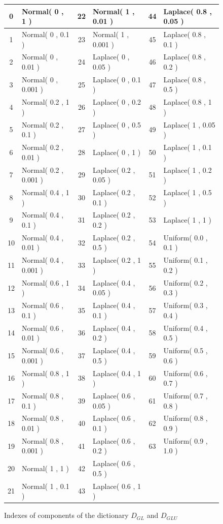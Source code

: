 \begin{figure}
\center
\begin{tabular}{|c|l|c|l|c|l|}
\hline
0 & Normal( 0 , 1 ) &22 & Normal( 1 , 0.01 ) &44 & Laplace( 0.8 , 0.05 ) \\ \hline
1 & Normal( 0 , 0.1 ) &23 & Normal( 1 , 0.001 ) &45 & Laplace( 0.8 , 0.1 ) \\ \hline
2 & Normal( 0 , 0.01 ) &24 & Laplace( 0 , 0.05 ) &46 & Laplace( 0.8 , 0.2 ) \\ \hline
3 & Normal( 0 , 0.001 ) &25 & Laplace( 0 , 0.1 ) &47 & Laplace( 0.8 , 0.5 ) \\ \hline
4 & Normal( 0.2 , 1 ) &26 & Laplace( 0 , 0.2 ) &48 & Laplace( 0.8 , 1 ) \\ \hline
5 & Normal( 0.2 , 0.1 ) &27 & Laplace( 0 , 0.5 ) &49 & Laplace( 1 , 0.05 ) \\ \hline
6 & Normal( 0.2 , 0.01 ) &28 & Laplace( 0 , 1 ) &50 & Laplace( 1 , 0.1 ) \\ \hline
7 & Normal( 0.2 , 0.001 ) &29 & Laplace( 0.2 , 0.05 ) &51 & Laplace( 1 , 0.2 ) \\ \hline
8 & Normal( 0.4 , 1 ) &30 & Laplace( 0.2 , 0.1 ) &52 & Laplace( 1 , 0.5 ) \\ \hline
9 & Normal( 0.4 , 0.1 ) &31 & Laplace( 0.2 , 0.2 ) &53 & Laplace( 1 , 1 ) \\ \hline
10 & Normal( 0.4 , 0.01 ) &32 & Laplace( 0.2 , 0.5 )&54 & Uniform( 0.0 , 0.1 ) \\ \hline
11 & Normal( 0.4 , 0.001 ) &33 & Laplace( 0.2 , 1 )&55 & Uniform( 0.1 , 0.2 ) \\ \hline
12 & Normal( 0.6 , 1 ) &34 & Laplace( 0.4 , 0.05 )&56 & Uniform( 0.2 , 0.3 ) \\ \hline
13 & Normal( 0.6 , 0.1 ) &35 & Laplace( 0.4 , 0.1 )&57 & Uniform( 0.3 , 0.4 ) \\ \hline
14 & Normal( 0.6 , 0.01 ) &36 & Laplace( 0.4 , 0.2 )&58 & Uniform( 0.4 , 0.5 ) \\ \hline
15 & Normal( 0.6 , 0.001 ) &37 & Laplace( 0.4 , 0.5 )&59 & Uniform( 0.5 , 0.6 ) \\ \hline
16 & Normal( 0.8 , 1 ) &38 & Laplace( 0.4 , 1 )&60 & Uniform( 0.6 , 0.7 ) \\ \hline
17 & Normal( 0.8 , 0.1 ) &39 & Laplace( 0.6 , 0.05 )&61 & Uniform( 0.7 , 0.8 ) \\ \hline
18 & Normal( 0.8 , 0.01 ) &40 & Laplace( 0.6 , 0.1 )&62 & Uniform( 0.8 , 0.9 ) \\ \hline
19 & Normal( 0.8 , 0.001 ) &41 & Laplace( 0.6 , 0.2 )&63 & Uniform( 0.9 , 1.0 ) \\ \hline
20 & Normal( 1 , 1 ) &42 & Laplace( 0.6 , 0.5 )& &   \\ \hline
21 & Normal( 1 , 0.1 ) &43 & Laplace( 0.6 , 1 )& &   \\ \hline
\end{tabular}
\caption{Indexes of components of the dictionary $D_{GL}$ and $D_{GLU}$ }
\label{table:densities_DGLU}
\end{figure}

